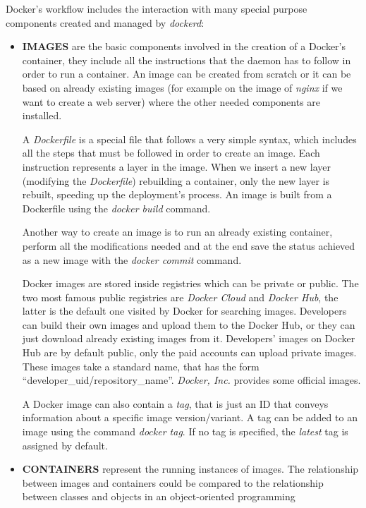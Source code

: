\documentclass[a4paper,12pt]{article}
\begin{document}
Docker's workflow includes the interaction with many special purpose components
created and managed by \textit{dockerd}:
\begin{itemize}
  \item \textbf{IMAGES} are the basic components involved in the creation of a
  Docker's container, they include all the instructions that the daemon has to
  follow in order to run a container. An image can be created from scratch or it
  can be based on already existing images (for example on the image of
  \textit{nginx} if we want to create a web server) where the other needed
  components are installed. \par A \textit{Dockerfile} is a special file that
  follows a very simple syntax, which includes all the steps that must be
  followed in order to create an image. Each instruction represents a layer in
  the image. When we insert a new layer (modifying the \textit{Dockerfile})
  rebuilding a container, only the new layer is rebuilt, speeding up the
  deployment's process. An image is built from a Dockerfile using the
  \textit{docker build} command. \par Another way to create an image is to run
  an already existing container, perform all the modifications needed and at the
  end save the status achieved as a new image with the \textit{docker commit}
  command.\par Docker images are stored inside registries which can be private
  or public. The two most famous public registries are \textit{Docker Cloud} and
  \textit{Docker Hub}, the latter is the default one visited by Docker for
  searching images. Developers can build their own images and upload them to the
  Docker Hub, or they can just download already existing images from it.
  Developers' images on Docker Hub are by default public, only the paid accounts
  can upload private images. These images take a standard name, that has the
  form ``developer\_uid/repository\_name''. \textit{Docker, Inc.} provides some
  official images. \par A Docker image can also contain a \textit{tag}, that is
  just an ID that conveys information about a specific image version/variant. A
  tag can be added to an image using the command \textit{docker tag}. If no tag
  is specified, the \textit{latest} tag is assigned by default.  
  \item \textbf{CONTAINERS} represent the running instances of images. The
  relationship between images and containers could be compared to the
  relationship between classes and objects in an object-oriented programming

\end{itemize}
\end{document}
